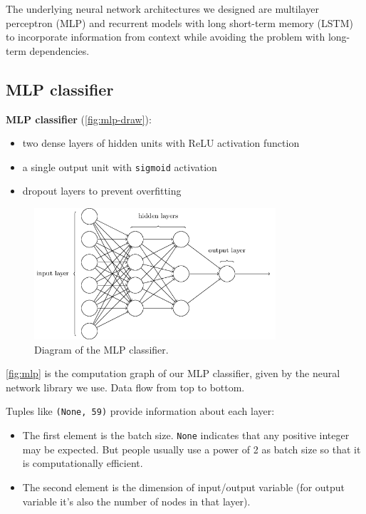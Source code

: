 \documentclass[11pt,a4paper]{report}
\begin{document}
The underlying neural network architectures we designed are multilayer perceptron (MLP) and recurrent models with long short-term memory (LSTM) \parencite{hochreiter1997long} to incorporate information from context while avoiding the problem with long-term dependencies.

\subsection{MLP classifier}

\begin{mdframed}
\noindent \textbf{MLP classifier} (\autoref{fig:mlp-draw}):
\begin{itemize}
  \item two dense layers of hidden units with ReLU \parencite{nair2010rectified} activation function
  \item a single output unit with \texttt{sigmoid} activation
  \item dropout \parencite{srivastava2014dropout} layers to prevent overfitting
\end{itemize}
\end{mdframed}

\begin{figure}[htbp]
  \centering
  \includegraphics[width=0.8\textwidth]{mlp.png}
  \caption{Diagram of the MLP classifier.} \label{fig:mlp-draw}
\end{figure}

\autoref{fig:mlp} is the computation graph of our MLP classifier, given by the neural network library we use.
Data flow from top to bottom.

Tuples like \texttt{(None, 59)} provide information about each layer:

\begin{itemize}
  \item The first element is the batch size.
    \texttt{None} indicates that any positive integer may be expected.
    But people usually use a power of 2 as batch size so that it is computationally efficient.
  \item The second element is the dimension of input/output variable (for output variable it's also the number of nodes in that layer).
\end{itemize}
\end{document}
